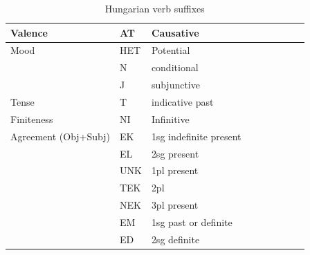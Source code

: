 \documentclass[11pt,letterpaper]{article}
\begin{document}
\begin{table}
    \centering
    \begin{tabular}{lllllllll}
    \hline
Valence	    & AT & Causative \\ \hline
Mood	    & HET & Potential \\
         & N & conditional \\
         & J & subjunctive \\
\hline
Tense& T & indicative past \\
         \hline
Finiteness  & NI & Infinitive \\
\hline
Agreement (Obj+Subj)         & EK & 1sg indefinite present\\
         & EL & 2sg present\\
         & UNK & 1pl present\\
         & TEK & 2pl\\
         & NEK & 3pl present\\
         & EM & 1sg past or definite \\
         & ED & 2sg definite \\
         \hline
    \end{tabular}
    \caption{Hungarian verb suffixes}
    \label{tab:my_label}
\end{table}
\end{document}
